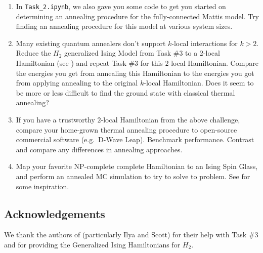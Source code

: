 \documentclass[12pt]{article}
\begin{document}
\begin{enumerate}
    \item In \texttt{Task\_2.ipynb}, we also gave you some code to get you started on determining
          an annealing procedure for the fully-connected Mattis model. Try finding an annealing
          procedure for this model at various system sizes.

    \item Many existing quantum annealers don't support $k$-local interactions for $k > 2$.
          Reduce the $H_2$ generalized Ising Model from Task \#3 to a $2$-local Hamiltonian
          (see \cite{xia2017electronic}) and repeat Task \#3 for this $2$-local Hamiltonian.
          Compare the energies you get from annealing this Hamiltonian to the energies
          you got from applying annealing to the original $k$-local Hamiltonian. Does it seem to
          be more or less difficult to find the ground state with classical thermal annealing?

\item If you have a trustworthy $2$-local Hamiltonian from the above challenge, compare your home-grown 
	thermal annealing procedure to open-source commercial software (e.g.~D-Wave Leap).  Benchmark
	performance.  Contrast and compare any differences in annealing approaches.

    \item Map your favorite NP-complete complete Hamiltonian to an Ising Spin Glass, and perform
          an annealed MC simulation to try to solve to problem. See \cite{ising_np} for some
          inspiration.
\end{enumerate}

\subsection*{Acknowledgements}\label{sec:acknowledgements}
We thank the authors of \cite{iqcc} (particularly Ilya and Scott) for their help with Task \#3 and for
providing the Generalized Ising Hamiltonians for $H_2$.

\newpage

\nocite{*}


\end{document}
